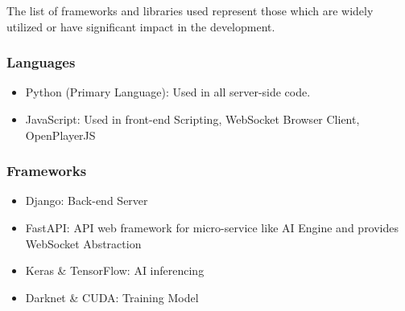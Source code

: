 The list of frameworks and libraries used represent those which are widely utilized or have significant impact in the development.

\subsubsection*{Languages}
\begin{itemize}
	\item Python (Primary Language): Used in all server-side code.
	\item JavaScript: Used in front-end Scripting, WebSocket Browser Client, OpenPlayerJS
\end{itemize}

\subsubsection*{Frameworks}
\begin{itemize}
	\item Django: Back-end Server
	\item FastAPI: API web framework for micro-service like AI Engine and provides WebSocket Abstraction
	\item Keras \& TensorFlow: AI inferencing
	\item Darknet \& CUDA: Training Model
\end{itemize}

